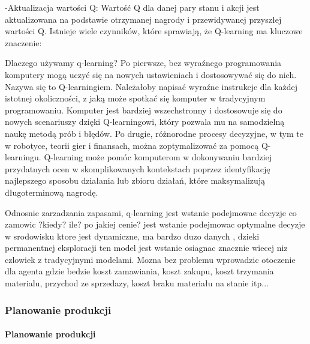 -Aktualizacja wartości Q: Wartość Q dla danej pary stanu i akcji jest aktualizowana na podstawie otrzymanej nagrody i przewidywanej przyszłej wartości Q. Istnieje wiele czynników, które sprawiają, że Q-learning ma kluczowe znaczenie:

Dlaczego używamy q-learning? Po pierwsze, bez wyraźnego programowania komputery mogą uczyć się na nowych ustawieniach i dostosowywać się do nich. Nazywa się to Q-learningiem. Należałoby napisać wyraźne instrukcje dla każdej istotnej okoliczności, z jaką może spotkać się komputer w tradycyjnym programowaniu. Komputer jest bardziej wszechstronny i dostosowuje się do nowych scenariuszy dzięki Q-learningowi, który pozwala mu na samodzielną naukę metodą prób i błędów.
Po drugie, różnorodne procesy decyzyjne, w tym te w robotyce, teorii gier i finansach, można zoptymalizować za pomocą Q-learningu. Q-learning może pomóc komputerom w dokonywaniu bardziej przydatnych ocen w skomplikowanych kontekstach poprzez identyfikację najlepszego sposobu działania lub zbioru działań, które maksymalizują długoterminową nagrodę.

Odnosnie zarzadzania zapasami, q-learning jest wstanie podejmowac decyzje co zamowic ?kiedy? ile? po jakiej cenie? jest wstanie podejmowac optymalne decyzje w srodowisku ktore jest dynamiczne, ma bardzo duzo danych , dzieki permanentnej eksploracji ten model jest wstanie osiagnac znacznie wiecej niz czlowiek z tradycyjnymi modelami. Mozna bez problemu wprowadzic otoczenie dla agenta gdzie bedzie koszt zamawiania, koszt zakupu, koszt trzymania materialu, przychod ze sprzedazy, koszt braku materiału na stanie itp...

\cite{Had2023}\cite{wiksvr2023}\cite{alakh2023}\cite{intell2023}





\newpage
\subsubsection{Planowanie produkcji}
 \vspace{\baselineskip} 
\paragraph{Planowanie produkcji}
 \vspace{\baselineskip} 

